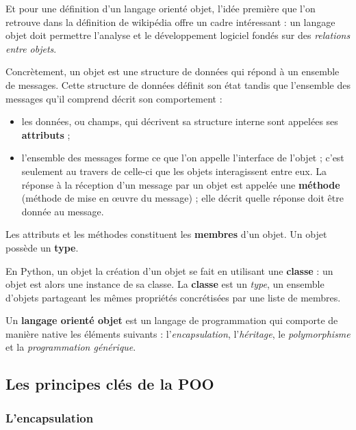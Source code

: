 \documentclass[
  a4paper,
  DIV=11,
  numbers=noendperiod]{scrartcl}
\providecommand{\tightlist}{%
  \setlength{\itemsep}{0pt}\setlength{\parskip}{0pt}}\usepackage{longtable,booktabs,array}
\begin{document}
Et pour une définition d'un langage orienté objet, l'idée première que
l'on retrouve dans la définition de wikipédia offre un cadre intéressant
: un langage objet doit permettre l'analyse et le développement logiciel
fondés sur des \emph{relations entre objets}.

Concrètement, un objet est une structure de données qui répond à un
ensemble de messages. Cette structure de données définit son état tandis
que l'ensemble des messages qu'il comprend décrit son comportement :

\begin{itemize}
\tightlist
\item
  les données, ou champs, qui décrivent sa structure interne sont
  appelées ses \textbf{attributs} ;
\item
  l'ensemble des messages forme ce que l'on appelle l'interface de
  l'objet ; c'est seulement au travers de celle-ci que les objets
  interagissent entre eux. La réponse à la réception d'un message par un
  objet est appelée une \textbf{méthode} (méthode de mise en œuvre du
  message) ; elle décrit quelle réponse doit être donnée au message.
\end{itemize}

Les attributs et les méthodes constituent les \textbf{membres} d'un
objet. Un objet possède un \textbf{type}.

En Python, un objet la création d'un objet se fait en utilisant une
\textbf{classe} : un objet est alors une instance de sa classe. La
\textbf{classe} est un \emph{type}, un ensemble d'objets partageant les
mêmes propriétés concrétisées par une liste de membres.

\begin{description}
\tightlist
\item[\textbf{Langage orienté objet}]
Un \textbf{langage orienté objet} est un langage de programmation qui
comporte de manière native les éléments suivants :
l'\emph{encapsulation}, l'\emph{héritage}, le \emph{polymorphisme} et la
\emph{programmation générique}.
\end{description}

\hypertarget{les-principes-cluxe9s-de-la-poo}{%
\subsection{Les principes clés de la
POO}\label{les-principes-cluxe9s-de-la-poo}}

\hypertarget{lencapsulation}{%
\subsubsection{L'encapsulation}\label{lencapsulation}}
\end{document}
